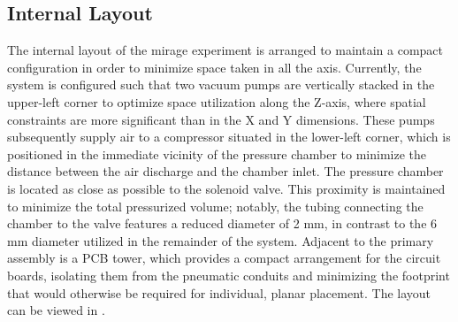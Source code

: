 

\subsection{Internal Layout}
The internal layout of the \gls{mirage} experiment is arranged to maintain a compact configuration in order to minimize space taken in all the axis.
Currently, the system is configured such that two vacuum pumps are vertically stacked in the upper-left corner to optimize space utilization along the Z-axis, where spatial constraints are more significant than in the X and Y dimensions.
These pumps subsequently supply air to a compressor situated in the lower-left corner, which is positioned in the immediate vicinity of the pressure chamber to minimize the distance between the air discharge and the chamber inlet.
The pressure chamber is located as close as possible to the solenoid valve.
This proximity is maintained to minimize the total pressurized volume; notably, the tubing connecting the chamber to the valve features a reduced diameter of 2 mm, in contrast to the 6 mm diameter utilized in the remainder of the system.
Adjacent to the primary assembly is a PCB tower, which provides a compact arrangement for the circuit boards, isolating them from the pneumatic conduits and minimizing the footprint that would otherwise be required for individual, planar placement.
The layout can be viewed in .


